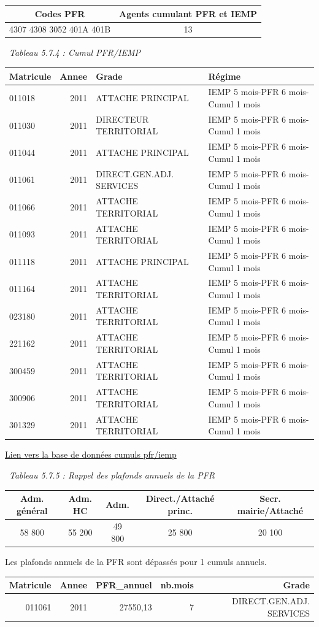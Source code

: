 \begin{longtable}[]{@{}cc@{}}
\toprule
Codes PFR & Agents cumulant PFR et IEMP\tabularnewline
\midrule
\endhead
4307 4308 3052 401A 401B & 13\tabularnewline
\bottomrule
\end{longtable}

~\emph{Tableau 5.7.4 : Cumul PFR/IEMP}

\begin{longtable}[]{@{}lrll@{}}
\toprule
Matricule & Annee & Grade & Régime\tabularnewline
\midrule
\endhead
011018 & 2011 & ATTACHE PRINCIPAL & IEMP 5 mois-PFR 6 mois-Cumul 1
mois\tabularnewline
011030 & 2011 & DIRECTEUR TERRITORIAL & IEMP 5 mois-PFR 6 mois-Cumul 1
mois\tabularnewline
011044 & 2011 & ATTACHE PRINCIPAL & IEMP 5 mois-PFR 6 mois-Cumul 1
mois\tabularnewline
011061 & 2011 & DIRECT.GEN.ADJ. SERVICES & IEMP 5 mois-PFR 6 mois-Cumul
1 mois\tabularnewline
011066 & 2011 & ATTACHE TERRITORIAL & IEMP 5 mois-PFR 6 mois-Cumul 1
mois\tabularnewline
011093 & 2011 & ATTACHE TERRITORIAL & IEMP 5 mois-PFR 6 mois-Cumul 1
mois\tabularnewline
011118 & 2011 & ATTACHE PRINCIPAL & IEMP 5 mois-PFR 6 mois-Cumul 1
mois\tabularnewline
011164 & 2011 & ATTACHE TERRITORIAL & IEMP 5 mois-PFR 6 mois-Cumul 1
mois\tabularnewline
023180 & 2011 & ATTACHE TERRITORIAL & IEMP 5 mois-PFR 6 mois-Cumul 1
mois\tabularnewline
221162 & 2011 & ATTACHE TERRITORIAL & IEMP 5 mois-PFR 6 mois-Cumul 1
mois\tabularnewline
300459 & 2011 & ATTACHE TERRITORIAL & IEMP 5 mois-PFR 6 mois-Cumul 1
mois\tabularnewline
300906 & 2011 & ATTACHE TERRITORIAL & IEMP 5 mois-PFR 6 mois-Cumul 1
mois\tabularnewline
301329 & 2011 & ATTACHE TERRITORIAL & IEMP 5 mois-PFR 6 mois-Cumul 1
mois\tabularnewline
\bottomrule
\end{longtable}

\href{../Bases/Reglementation/personnels.pfr.iemp.csv}{Lien vers la base de
données cumuls pfr/iemp}

~\emph{Tableau 5.7.5 : Rappel des plafonds annuels de la PFR}

\begin{longtable}[]{@{}ccccc@{}}
\toprule
Adm. général & Adm. HC & Adm. & Direct./Attaché princ. & Secr.
mairie/Attaché\tabularnewline
\midrule
\endhead
58 800 & 55 200 & 49 800 & 25 800 & 20 100\tabularnewline
\bottomrule
\end{longtable}

Les plafonds annuels de la PFR sont dépassés pour 1 cumuls annuels.

\begin{longtable}[]{@{}rrrrr@{}}
\toprule
Matricule & Annee & PFR\_annuel & nb.mois & Grade\tabularnewline
\midrule
\endhead
011061 & 2011 & 27550,13 & 7 & DIRECT.GEN.ADJ. SERVICES\tabularnewline
\bottomrule
\end{longtable}

